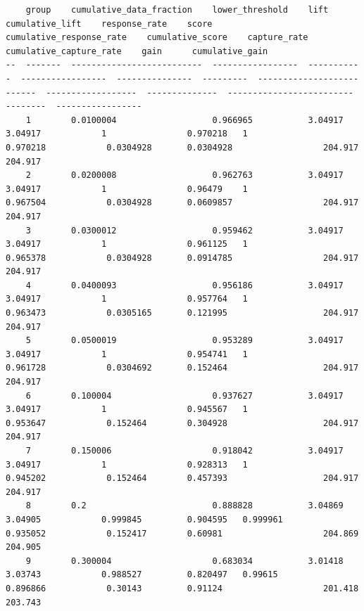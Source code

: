 \documentclass[11pt]{article}
\begin{document}
    
    \begin{verbatim}
    group    cumulative_data_fraction    lower_threshold    lift         cumulative_lift    response_rate    score      cumulative_response_rate    cumulative_score    capture_rate    cumulative_capture_rate    gain      cumulative_gain
--  -------  --------------------------  -----------------  -----------  -----------------  ---------------  ---------  --------------------------  ------------------  --------------  -------------------------  --------  -----------------
    1        0.0100004                   0.966965           3.04917      3.04917            1                0.970218   1                           0.970218            0.0304928       0.0304928                  204.917   204.917
    2        0.0200008                   0.962763           3.04917      3.04917            1                0.96479    1                           0.967504            0.0304928       0.0609857                  204.917   204.917
    3        0.0300012                   0.959462           3.04917      3.04917            1                0.961125   1                           0.965378            0.0304928       0.0914785                  204.917   204.917
    4        0.0400093                   0.956186           3.04917      3.04917            1                0.957764   1                           0.963473            0.0305165       0.121995                   204.917   204.917
    5        0.0500019                   0.953289           3.04917      3.04917            1                0.954741   1                           0.961728            0.0304692       0.152464                   204.917   204.917
    6        0.100004                    0.937627           3.04917      3.04917            1                0.945567   1                           0.953647            0.152464        0.304928                   204.917   204.917
    7        0.150006                    0.918042           3.04917      3.04917            1                0.928313   1                           0.945202            0.152464        0.457393                   204.917   204.917
    8        0.2                         0.888828           3.04869      3.04905            0.999845         0.904595   0.999961                    0.935052            0.152417        0.60981                    204.869   204.905
    9        0.300004                    0.683034           3.01418      3.03743            0.988527         0.820497   0.99615                     0.896866            0.30143         0.91124                    201.418   203.743

\end{verbatim}
\end{document}
